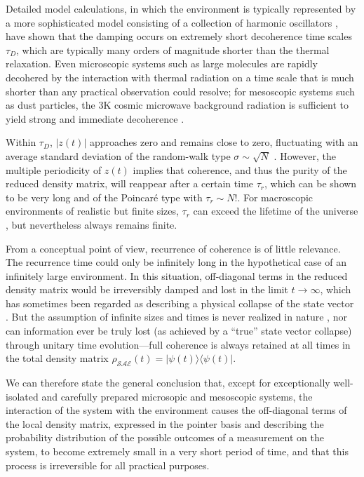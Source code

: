 \documentclass[rmp,aps,amsmath,amsfonts,noshowkeys,noshowpacs,12pt]{revtex4}
\newcommand{\ket}[1]{\ensuremath{|{#1\rangle}}}
\newcommand{\bra}[1]{\ensuremath{{\langle #1}|}}
\begin{document}
Detailed model calculations, in which the environment is typically
represented by a more sophisticated model consisting of a collection
of harmonic oscillators
\citep{Zurek:1993:qq,Zurek:2002:ii,Joos:2003:jh,Caldeira:1983:on,Unruh:1989:rc,Hu:1992:om},
have shown that the damping occurs on extremely short decoherence time
scales $\tau_D$, which are typically many orders of magnitude shorter
than the thermal relaxation. Even microscopic systems such as large
molecules are rapidly decohered by the interaction with thermal
radiation on a time scale that is much shorter than any practical
observation could resolve; for mesoscopic systems such as dust
particles, the 3K cosmic microwave background radiation is sufficient
to yield strong and immediate decoherence
\citep{Joos:1985:iu,Zurek:1991:vv}.

Within $\tau_D$, $|z(t)|$ approaches zero and remains close to zero,
fluctuating with an average standard deviation of the random-walk type
$\sigma \sim \sqrt{N}$ \citep{Zurek:1982:tv}. However, the multiple
periodicity of $z(t)$ implies that coherence, and thus the purity of
the reduced density matrix, will reappear after a certain time
$\tau_r$, which can be shown to be very long and of the Poincar\'e
type with $\tau_r \sim N!$. For macroscopic environments of realistic
but finite sizes, $\tau_r$ can exceed the lifetime of the universe
\citep{Zurek:1982:tv}, but nevertheless always remains finite.

From a conceptual point of view, recurrence of coherence is of little
relevance. The recurrence time could only be infinitely long in the
hypothetical case of an infinitely large environment. In this
situation, off-diagonal terms in the reduced density matrix would be
irreversibly damped and lost in the limit $t \rightarrow \infty$,
which has sometimes been regarded as describing a physical collapse of
the state vector \citep{Hepp:1972:pa}. But the assumption of infinite
sizes and times is never realized in nature \citep{Bell:1975:oi}, nor
can information ever be truly lost (as achieved by a ``true'' state
vector collapse) through unitary time evolution---full coherence is
always retained at all times in the total density matrix
$\rho_\mathcal{SAE}(t)=\ket{\psi(t)} \bra{\psi(t)}$.

We can therefore state the general conclusion that, except for
exceptionally well-isolated and carefully prepared microsopic and
mesoscopic systems, the interaction of the system with the environment
causes the off-diagonal terms of the local density matrix, expressed
in the pointer basis and describing the probability distribution of
the possible outcomes of a measurement on the system, to become
extremely small in a very short period of time, and that this process
is irreversible for all practical purposes.
\end{document}
